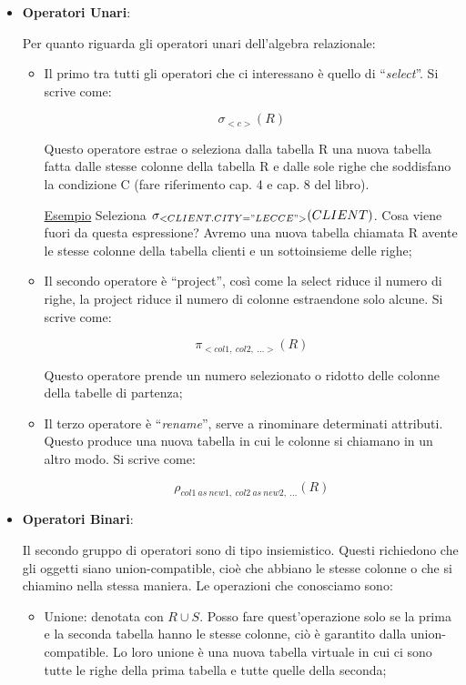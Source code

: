 \begin{itemize}

\item{\textbf{Operatori Unari}}:

Per quanto riguarda gli operatori unari dell'algebra relazionale: 

\begin{itemize}

\item Il primo tra tutti gli operatori che ci interessano è quello di “\textit{select}”. Si scrive come: 

\[
	\sigma_{<c>}(R)
\]

Questo operatore estrae o seleziona dalla tabella R una nuova tabella fatta dalle stesse colonne della tabella R e dalle sole righe che soddisfano la condizione C (fare riferimento cap. 4 e cap. 8 del libro).

\underline{Esempio} Seleziona $\sigma_{<CLIENT.CITY="LECCE">}(CLIENT)$. Cosa viene fuori da questa espressione? Avremo una nuova tabella chiamata R avente le stesse colonne della tabella clienti e un sottoinsieme delle righe;


\item Il secondo operatore è “project”, così come la select riduce il numero di righe, la project riduce il numero di colonne estraendone solo alcune. Si scrive come:

\[
	\pi_{<col1,\ col2,\ \dots>}(R)
\]

Questo operatore prende un numero selezionato o ridotto delle colonne della tabelle di  partenza;

\item Il terzo operatore è “\textit{rename}”, serve a rinominare determinati attributi. Questo produce una nuova tabella in cui le colonne si chiamano in un altro modo. Si scrive come: 

\[
	\rho_{col1\ as\ new1,\ col2\ as\ new2,\ \dots}(R)
\]

\end{itemize}

\item{\textbf{Operatori Binari}}:

Il secondo gruppo di operatori sono di tipo insiemistico. Questi richiedono che gli oggetti siano  union-compatible, cioè che abbiano le stesse colonne o che si chiamino nella stessa maniera.  Le operazioni che conosciamo sono: 

\begin{itemize}

\item{Unione}: denotata con $R \cup S$. Posso fare quest'operazione solo se la prima e la seconda tabella hanno le stesse colonne, ciò è garantito dalla union-compatible. Lo loro unione è una nuova tabella virtuale in cui ci sono tutte le righe della prima tabella e tutte quelle della seconda;


\end{itemize}
\end{itemize}
